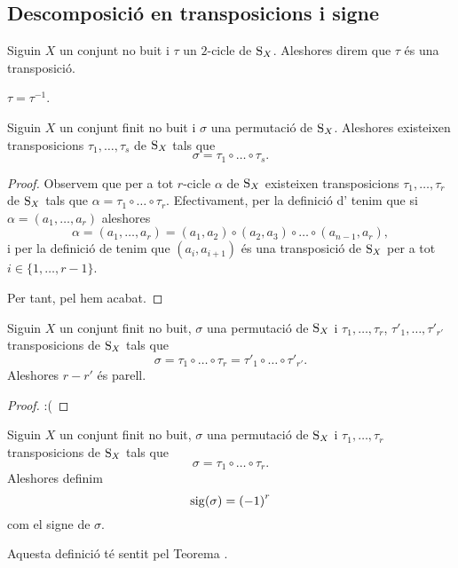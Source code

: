\documentclass[../Apunts.tex]{subfiles}
\begin{document}
	\subsection{Descomposició en transposicions i signe}
	\begin{definition}[Transposició]
		\label{def:transposició}
		Siguin \(X\) un conjunt no buit i \(\tau\) un \(2\)-cicle de \(\operatorname{S}_{X}\). Aleshores direm que \(\tau\) és una transposició.
	\end{definition}
	\begin{observation}
		\(\tau=\tau^{-1}\).
	\end{observation}
	\begin{proposition}
		Siguin \(X\) un conjunt finit no buit i \(\sigma\) una permutació de \(\operatorname{S}_{X}\). Aleshores existeixen transposicions \(\tau_{1},\dots,\tau_{s}\) de \(\operatorname{S}_{X}\) tals que
		\[\sigma=\tau_{1}\circ\dots\circ\tau_{s}.\]
		\begin{proof}
			Observem que per a tot \(r\)-cicle \(\alpha\) de \(\operatorname{S}_{X}\) existeixen transposicions \(\tau_{1},\dots,\tau_{r}\) de \(\operatorname{S}_{X}\) tals que \(\alpha=\tau_{1}\circ\dots\circ\tau_{r}\). Efectivament, per la definició d' tenim que si \(\alpha=(a_{1},\dots,a_{r})\) aleshores
			\[\alpha=(a_{1},\dots,a_{r})=(a_{1},a_{2})\circ(a_{2},a_{3})\circ\dots\circ(a_{n-1},a_{r}),\]
			i per la definició de  tenim que \((a_{i},a_{i+1})\) és una transposició de \(\operatorname{S}_{X}\) per a tot \(i\in\{1,\dots,r-1\}\).
			
			Per tant, pel  hem acabat.
		\end{proof}
	\end{proposition}
	\begin{theorem}
		\label{thm:paritat nombre de transposicions en la descomposició d'una permutació}
		\label{thm:signe d'una permutació}
		Siguin \(X\) un conjunt finit no buit, \(\sigma\) una permutació de \(\operatorname{S}_{X}\) i \(\tau_{1},\dots,\tau_{r}\), \(\tau'_{1},\dots,\tau'_{r'}\) transposicions de \(\operatorname{S}_{X}\) tals que
		\[\sigma=\tau_{1}\circ\dots\circ\tau_{r}=\tau'_{1}\circ\dots\circ\tau'_{r'}.\]
		Aleshores \(r-r'\) és parell.
		\begin{proof}
			:(%
		\end{proof}
	\end{theorem}
	\begin{definition}
		\label{def:signe d'una permutació}
		Siguin \(X\) un conjunt finit no buit, \(\sigma\) una permutació de \(\operatorname{S}_{X}\) i \(\tau_{1},\dots,\tau_{r}\) transposicions de \(\operatorname{S}_{X}\) tals que
		\[\sigma=\tau_{1}\circ\dots\circ\tau_{r}.\]
		Aleshores definim
		\[\operatorname{sig}(\sigma)={(-1)}^{r}\]
		com el signe de \(\sigma\).
		
		Aquesta definició té sentit pel Teorema .
	\end{definition}
\end{document}

